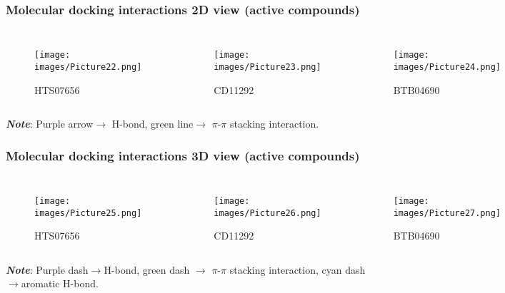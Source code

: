 \documentclass{beamer}
\begin{document}
\begin{frame}
\frametitle{\textbf{Molecular docking interactions 2D view (active compounds)}}
\begin{columns}[c] 
\begin{figure}
\texttt{[image: images/Picture22.png]}
\caption{HTS07656}
\end{figure}
\begin{figure}
\texttt{[image: images/Picture23.png]}
\caption{CD11292}
\end{figure}
\begin{figure}
\texttt{[image: images/Picture24.png]}
\caption{BTB04690}
\end{figure}
\end{columns}
\textbf{\emph{Note}}: Purple arrow$\rightarrow$ H-bond, green line$\rightarrow$ $\pi$-$\pi$ stacking interaction.
\end{frame}

\begin{frame}
\frametitle{\textbf{Molecular docking  interactions 3D view (active compounds)}}
\begin{columns}[c] 
\begin{figure}
\texttt{[image: images/Picture25.png]}
\caption{HTS07656}
\end{figure}
\begin{figure}
\texttt{[image: images/Picture26.png]}
\caption{CD11292}
\end{figure}
\begin{figure}
\texttt{[image: images/Picture27.png]}
\caption{BTB04690}
\end{figure}
\end{columns}
\textbf{\emph{Note}}: Purple dash$\rightarrow$H-bond, green dash $\rightarrow$ $\pi$-$\pi$ stacking interaction, cyan dash$\rightarrow$aromatic H-bond.
\end{frame}
\end{document}
